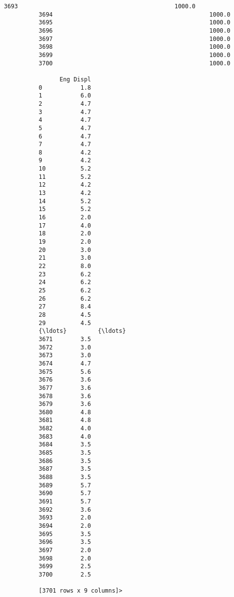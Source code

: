 \documentclass[11pt]{article}
\begin{document}
\begin{Verbatim}[commandchars=\\\{\}]
          3693                                             1000.0                               
          3694                                             1000.0                               
          3695                                             1000.0                               
          3696                                             1000.0                               
          3697                                             1000.0                               
          3698                                             1000.0                               
          3699                                             1000.0                               
          3700                                             1000.0                               
          
                Eng Displ  
          0           1.8  
          1           6.0  
          2           4.7  
          3           4.7  
          4           4.7  
          5           4.7  
          6           4.7  
          7           4.7  
          8           4.2  
          9           4.2  
          10          5.2  
          11          5.2  
          12          4.2  
          13          4.2  
          14          5.2  
          15          5.2  
          16          2.0  
          17          4.0  
          18          2.0  
          19          2.0  
          20          3.0  
          21          3.0  
          22          8.0  
          23          6.2  
          24          6.2  
          25          6.2  
          26          6.2  
          27          8.4  
          28          4.5  
          29          4.5  
          {\ldots}         {\ldots}  
          3671        3.5  
          3672        3.0  
          3673        3.0  
          3674        4.7  
          3675        5.6  
          3676        3.6  
          3677        3.6  
          3678        3.6  
          3679        3.6  
          3680        4.8  
          3681        4.8  
          3682        4.0  
          3683        4.0  
          3684        3.5  
          3685        3.5  
          3686        3.5  
          3687        3.5  
          3688        3.5  
          3689        5.7  
          3690        5.7  
          3691        5.7  
          3692        3.6  
          3693        2.0  
          3694        2.0  
          3695        3.5  
          3696        3.5  
          3697        2.0  
          3698        2.0  
          3699        2.5  
          3700        2.5  
          
          [3701 rows x 9 columns]>
\end{Verbatim}
        
\end{document}
